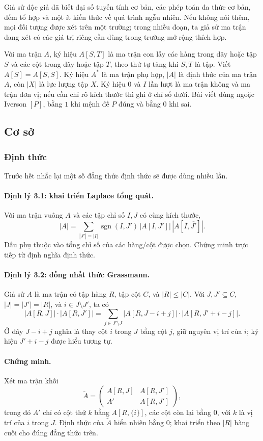 \documentclass[11pt]{article}
\begin{document}
Giả sử độc giả đã biết đại số tuyến tính cơ bản, các phép toán đa thức cơ bản,
đếm tổ hợp và một ít kiến thức về quá trình ngẫu nhiên. Nếu không nói thêm, mọi
đối tượng được xét trên một trường; trong nhiều đoạn, ta giả sử ma trận đang xét
có các giá trị riêng cần dùng trong trường mở rộng thích hợp.

Với ma trận $A$, ký hiệu $A[S,T]$ là ma trận con lấy các hàng trong dãy hoặc tập
$S$ và các cột trong dãy hoặc tập $T$, theo thứ tự tăng khi $S,T$ là tập. Viết
$A[S]=A[S,S]$. Ký hiệu $A^*$ là ma trận phụ hợp, $|A|$ là định thức của ma trận
$A$, còn $|X|$ là lực lượng tập $X$. Ký hiệu $0$ và $I$ lần lượt là ma trận
không và ma trận đơn vị; nếu cần chỉ rõ kích thước thì ghi ở chỉ số dưới. Bài
viết dùng ngoặc Iverson $[P]$, bằng $1$ khi mệnh đề $P$ đúng và bằng $0$ khi
sai.

\subsection{Cơ sở}

\subsubsection{Định thức}

Trước hết nhắc lại một số đẳng thức định thức sẽ được dùng nhiều lần.

\paragraph{Định lý 3.1: khai triển Laplace tổng quát.}
Với ma trận vuông $A$ và các tập chỉ số $I,J$ có cùng kích thước,
\[
  |A|=\sum_{|J'|=|I|}\operatorname{sgn}(I,J')\,|A[I,J']|\,
  |A[\overline I,\overline {J'}]|.
\]
Dấu phụ thuộc vào tổng chỉ số của các hàng/cột được chọn. Chứng minh trực tiếp
từ định nghĩa định thức.

\paragraph{Định lý 3.2: đồng nhất thức Grassmann.}
Giả sử \(A\) là ma trận có tập hàng \(R\), tập cột \(C\), và \(|R|\le |C|\).
Với \(J,J'\subseteq C\), \(|J|=|J'|=|R|\), và \(i\in J\setminus J'\), ta có
\[
  |A[R,J]|\cdot |A[R,J']|
  =
  \sum_{j\in J'\setminus J}
  |A[R,J-i+j]|\cdot |A[R,J'+i-j]|.
\]
Ở đây \(J-i+j\) nghĩa là thay cột \(i\) trong \(J\) bằng cột \(j\), giữ nguyên
vị trí của \(i\); ký hiệu \(J'+i-j\) được hiểu tương tự.

\paragraph{Chứng minh.}
Xét ma trận khối
\[
  \tilde A=
  \begin{pmatrix}
    A[R,J] & A[R,J']\\
    A'     & A[R,J']
  \end{pmatrix},
\]
trong đó \(A'\) chỉ có cột thứ \(k\) bằng \(A[R,\{i\}]\), các cột còn lại bằng
0, với \(k\) là vị trí của \(i\) trong \(J\). Định thức của \(\tilde A\) hiển
nhiên bằng \(0\); khai triển theo \(|R|\) hàng cuối cho đúng đẳng thức trên.
\end{document}
